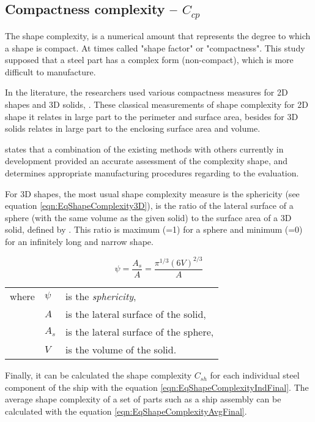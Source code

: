 \subsection{Compactness complexity -- $C_{cp}$}
The shape complexity, is a numerical amount that represents the degree to which a shape is compact. At times called "shape factor" or "compactness". This study supposed that a steel part has a complex form (non-compact), which is more difficult to manufacture.

In the literature, the researchers used various compactness measures for 2D shapes and 3D solids, \cite{valentan2008}. These classical measurements of shape complexity for 2D shape it relates in large part to the perimeter and surface area, besides for 3D solids relates in large part to the enclosing surface area and volume.

\cite{valentan2008} states that a combination of the existing methods with others currently in development provided an accurate assessment of the complexity shape, and determines appropriate manufacturing procedures regarding to the evaluation.

For 3D shapes, the most usual shape complexity measure is the sphericity (see equation \ref{eqn:EqShapeComplexity3D}), is the ratio of the lateral surface of a sphere (with the same volume as the given solid) to the surface area of a 3D solid, defined by \cite{wadell1935volume}. %
This ratio is maximum (=1) for a sphere and minimum (=0) for an infinitely long and narrow shape.

\begin{equation}
\psi = \frac{A_s}{A}= \frac{\pi^{1/3}(6V)^{2/3}}{A}
\label{eqn:EqShapeComplexity3D}
\end{equation}

\begin{tabular}{l l l}
where		& $\psi$ 	& is the \textit{sphericity},\\
				& $A$		& is the lateral surface of the solid,\\
				& $A_s$	& is the lateral surface of the sphere,\\
				& $V$		& is the volume of the solid.
\end{tabular}

Finally, it can be calculated the shape complexity $C_{sh}$ for each individual steel component of the ship with the equation \ref{eqn:EqShapeComplexityIndFinal}. The average shape complexity of a set of parts such as a ship assembly can be calculated  with the equation \ref{eqn:EqShapeComplexityAvgFinal}.
	

